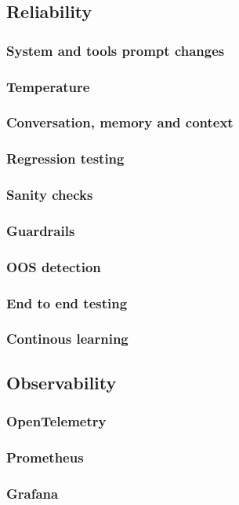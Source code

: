 \documentclass[12pt, a4paper, oneside, romanian, draft]{teza-upb}
\begin{document}
    \subsection{Reliability}
      \subsubsection{System and tools prompt changes}
      \subsubsection{Temperature}
      \subsubsection{Conversation, memory and context}
      \subsubsection{Regression testing}
      \subsubsection{Sanity checks}
      \subsubsection{Guardrails}
      \subsubsection{OOS detection}
      \subsubsection{End to end testing}
      \subsubsection{Continous learning}
    \subsection{Observability}
      \subsubsection{OpenTelemetry}
      \subsubsection{Prometheus}
      \subsubsection{Grafana}
\end{document}
